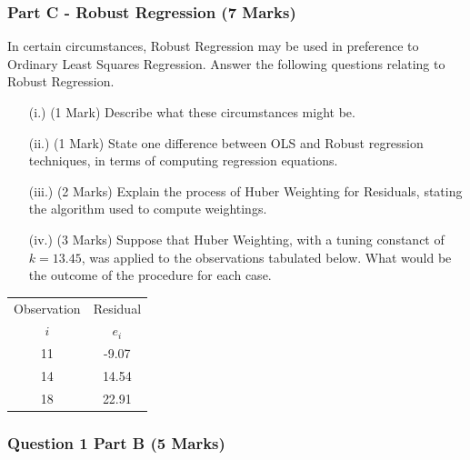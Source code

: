 \documentclass[a4paper,12pt]{article}
\begin{document}
\bigskip

\subsubsection*{Part C - Robust Regression (7 Marks)}



In certain circumstances, Robust Regression may be used in preference to Ordinary Least Squares Regression. Answer the following questions relating to Robust Regression. 

\begin{itemize}
	\item[(i.)] (1 Mark) Describe what these circumstances might be.
	\item[(ii.)] (1 Mark) State one difference between OLS and Robust regression techniques, in terms of computing regression equations.
	\item[(iii.)] (2 Marks) Explain the process of Huber Weighting for Residuals, stating the algorithm used to compute weightings.
	\item[(iv.)] (3 Marks) Suppose that Huber Weighting, with a tuning constanct of $k=13.45$, was applied to the observations 
	tabulated below. What would be the outcome of the procedure for each case. 
\end{itemize}
\begin{center}
	\begin{tabular}{|c|c|}
		\hline
		Observation & Residual \\ 
		$i$  & $e_i$ \\ \hline
		11 & -9.07 \\ \hline 
		14 & 14.54 \\ \hline
		18 & 22.91 \\ \hline
	\end{tabular} 
\end{center}	
	\subsubsection*{Question 1 Part B (5 Marks)}
	
\end{document}
